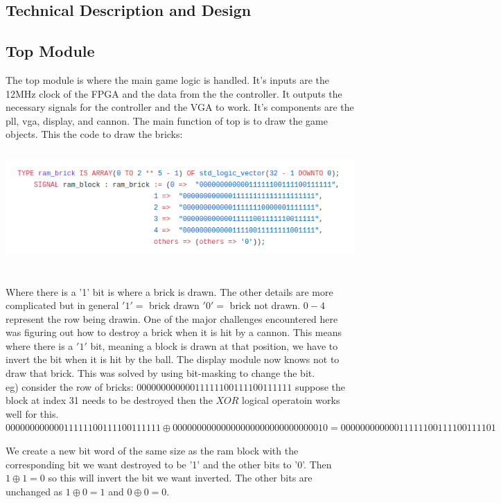 \documentclass[12pt]{article}
\begin{document}
\begin{flushleft}
\section{Technical Description and Design}
\subsection{Top Module}

The top module is where the main game logic is handled. It's inputs are the
12MHz clock of the FPGA and the data from the the controller. It outputs the
necessary signals for the controller and the VGA to work. It's components
are the pll, vga, display, and cannon. The main function of top is to draw the
game objects. This the code to draw the bricks:\\
\includegraphics[width=15cm, height=5cm]{drawingBricks}

Where there is a '1' bit is where a brick is drawn. The other details are more
complicated but in general $'1' = $ brick drawn $'0'=$ brick not drawn. $0 - 4$
represent the row being drawin. One of the major challenges encountered here was
figuring out how to destroy a brick when it is hit by a cannon. This means where
there is a $'1'$ bit, meaning a block is drawn at that position, we have to invert
the bit when it is hit by the ball. The display module now knows not to draw
that brick. This was solved by using bit-masking to change the bit.\\ 
eg) consider the row of bricks: $00000000000011111100111100111111$
suppose the block at index 31 needs to be destroyed then the $XOR$ logical
operatoin works well for this. 
$00000000000011111100111100111111 \oplus 00000000000000000000000000000010 =
00000000000011111100111100111101$ 

We create a new bit word of the same size as the ram block  with the corresponding bit we want destroyed to be '1'
and the other bits to '0'. Then $ 1 \oplus 1 = 0$ so this will invert the bit we
want inverted. The other bits are unchanged as $1 \oplus 0 = 1$ and $0 \oplus 0 = 0$.  


\end{flushleft}
\end{document}
